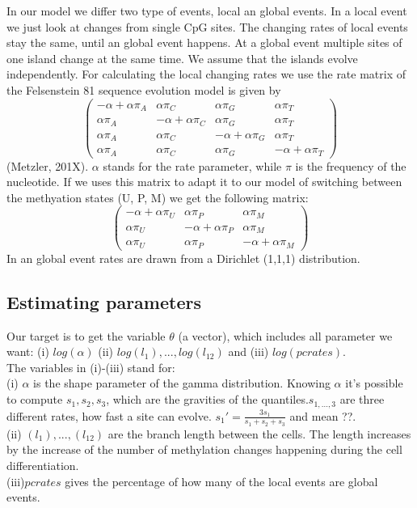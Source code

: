 \documentclass[12pt]{article} %
\begin{document}
	In our model we differ two type of events, local an global events. In a local event we just look at changes from single CpG sites. The changing rates of local events stay the same, until an global event happens. At a global event multiple sites of one island change at the same time. We assume that the islands evolve independently.
	For calculating the local changing rates we use the rate matrix of the Felsenstein 81 sequence evolution model is given by
	\begin{equation*}
	\begin{pmatrix}
	-\alpha+\alpha \pi_A & \alpha \pi_C & \alpha \pi_G & \alpha \pi_T\\
	\alpha \pi_A & -\alpha + \alpha \pi_C & \alpha \pi_G & \alpha \pi_T\\
	\alpha \pi_A & \alpha \pi_C & -\alpha + \alpha \pi_G & \alpha \pi_T\\
	\alpha \pi_A & \alpha \pi_C & \alpha \pi_G & -\alpha + \alpha \pi_T
	\end{pmatrix}
	\end{equation*}
	(Metzler, 201X). $\alpha$ stands for the rate parameter, while $\pi$ is the frequency of the nucleotide. If we uses this matrix to adapt it to our model of switching between the methyation states (U, P, M) we get the following matrix: 
	\begin{equation}
	\begin{pmatrix}
	-\alpha+\alpha \pi_U & \alpha \pi_P & \alpha \pi_M\\
	\alpha \pi_U & -\alpha + \alpha \pi_P & \alpha \pi_M\\
	\alpha \pi_U & \alpha \pi_P & -\alpha + \alpha \pi_M
	\end{pmatrix}
	\end{equation}
	In an global event rates are drawn from a Dirichlet (1,1,1) distribution.
	
	\subsection{Estimating parameters} 
	Our target is to get the variable $\theta$ (a vector), which includes all parameter we want: (i) $log(\alpha)$ (ii)  $log(l_1),...,log(l_{12})$ and (iii) $log(pcrates)$.\\
	
	The variables in (i)-(iii) stand for:\\
	(i) $\alpha$ is the shape parameter of the gamma distribution. Knowing $\alpha$ it's possible to compute $s_1, s_2 ,s_3$, which are the gravities of the quantiles.$s_{1,...,3}$ are three different rates, how fast a site can evolve. $s_1' = \frac{3 s_1}{s_1+s_2+s_3}$ and mean ??.\\
	(ii) $(l_1),...,(l_{12})$ are the branch length between the cells. The length increases by the increase of the number of methylation changes happening during the cell differentiation.\\
	(iii)$pcrates$ gives the percentage of how many of the local events are global events.
	
\end{document}
